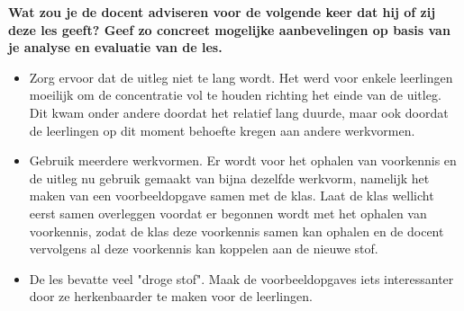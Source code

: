\documentclass{article}
\begin{document}
                \textbf{Wat zou je de docent adviseren voor de volgende keer dat hij of zij deze les geeft? Geef zo concreet mogelijke aanbevelingen op basis van je analyse en evaluatie van de les.} \\
                \begin{itemize}
                    \item Zorg ervoor dat de uitleg niet te lang wordt. Het werd voor enkele leerlingen moeilijk om de concentratie vol te houden richting het einde van de uitleg. Dit kwam onder andere doordat het relatief lang duurde, maar ook doordat de leerlingen op dit moment behoefte kregen aan andere werkvormen.
                    \item Gebruik meerdere werkvormen. Er wordt voor het ophalen van voorkennis en de uitleg nu gebruik gemaakt van bijna dezelfde werkvorm, namelijk het maken van een voorbeeldopgave samen met de klas. Laat de klas wellicht eerst samen overleggen voordat er begonnen wordt met het ophalen van voorkennis, zodat de klas deze voorkennis samen kan ophalen en de docent vervolgens al deze voorkennis kan koppelen aan de nieuwe stof.
                    \item De les bevatte veel "droge stof". Maak de voorbeeldopgaves iets interessanter door ze herkenbaarder te maken voor de leerlingen. 
                \end{itemize}
            \newpage
\end{document}

